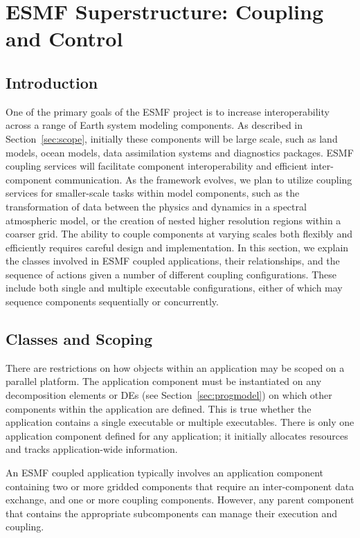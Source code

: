 \section{ESMF Superstructure:  Coupling and Control}
\label{sec:superclasses}

\subsection{Introduction}

One of the primary goals of the ESMF project is to increase interoperability
across a range of Earth system modeling components.  As described in 
Section~\ref{sec:scope}, initially these 
components will be large scale, such as land models, ocean models, 
data assimilation systems and diagnostics packages.  ESMF coupling 
services will facilitate component 
interoperability and efficient inter-component communication.  As the 
framework evolves, we plan to utilize coupling services for smaller-scale 
tasks within model components, such as the transformation of data between the 
physics and dynamics in a spectral atmospheric model, or the creation 
of nested higher resolution regions within a coarser grid.  The ability to 
couple components at varying scales both flexibly and efficiently requires
careful design and implementation.  In this section, we 
explain the classes involved in ESMF coupled applications, their 
relationships, and the sequence of actions given a number of different 
coupling configurations.  These include both single and multiple 
executable configurations, either of which may sequence components
sequentially or concurrently. 

\subsection{Classes and Scoping}

There are restrictions on how objects within an application may be scoped
on a parallel platform.  The application component must be instantiated on 
any decomposition elements or DEs (see Section~\ref{sec:progmodel}) on 
which other components
within the application are defined.  This is true whether the 
application contains a single executable or multiple 
executables.  There is only one application component defined for any
application; it initially allocates resources and tracks application-wide 
information.  

An ESMF coupled application typically involves an application component 
containing two or more gridded components that require an 
inter-component data exchange, and one or more coupling 
components.  However, any parent component that contains the appropriate 
subcomponents can manage their execution and coupling.

